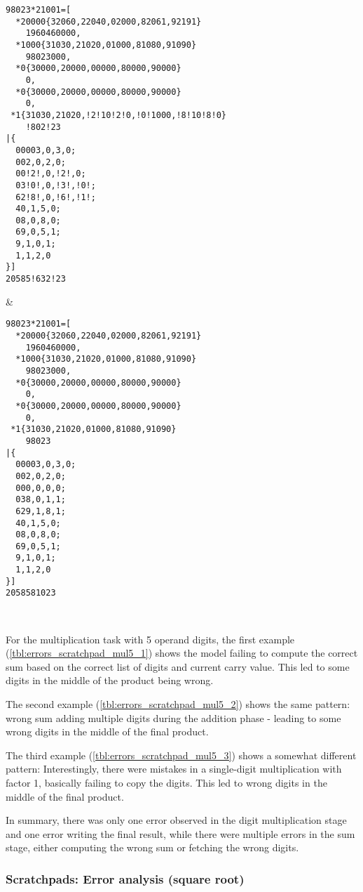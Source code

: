 \ErrorAnalysisTableBegin
\begin{lstlisting}
98023*21001=[
  *20000{32060,22040,02000,82061,92191}
    1960460000,
  *1000{31030,21020,01000,81080,91090}
    98023000,
  *0{30000,20000,00000,80000,90000}
    0,
  *0{30000,20000,00000,80000,90000}
    0,
 *1{31030,21020,!2!10!2!0,!0!1000,!8!10!8!0}
    !802!23
|{
  00003,0,3,0;
  002,0,2,0;
  00!2!,0,!2!,0;
  03!0!,0,!3!,!0!;
  62!8!,0,!6!,!1!;
  40,1,5,0;
  08,0,8,0;
  69,0,5,1;
  9,1,0,1;
  1,1,2,0
}]
20585!632!23
\end{lstlisting} &
\begin{lstlisting}
98023*21001=[
  *20000{32060,22040,02000,82061,92191}
    1960460000,
  *1000{31030,21020,01000,81080,91090}
    98023000,
  *0{30000,20000,00000,80000,90000}
    0,
  *0{30000,20000,00000,80000,90000}
    0,
 *1{31030,21020,01000,81080,91090}
    98023
|{
  00003,0,3,0;
  002,0,2,0;
  000,0,0,0;
  038,0,1,1;
  629,1,8,1;
  40,1,5,0;
  08,0,8,0;
  69,0,5,1;
  9,1,0,1;
  1,1,2,0
}]
2058581023
\end{lstlisting}
\\

For the multiplication task with 5 operand digits, the first example (\cref{tbl:errors_scratchpad_mul5_1}) shows the model failing to compute the correct sum based on the correct list of digits and current carry value. This led to some digits in the middle of the product being wrong.

The second example  (\cref{tbl:errors_scratchpad_mul5_2}) shows the same pattern: wrong sum adding multiple digits during the addition phase - leading to some wrong digits in the middle of the final product.

The third example  (\cref{tbl:errors_scratchpad_mul5_3}) shows a somewhat different pattern: Interestingly, there were mistakes in a single-digit multiplication with factor 1, basically failing to copy the digits. This led to wrong digits in the middle of the final product.

In summary, there was only one error observed in the digit multiplication stage and one error writing the final result, while there were multiple errors in the sum stage, either computing the wrong sum or fetching the wrong digits.

\subsubsection{Scratchpads: Error analysis (square root)}



